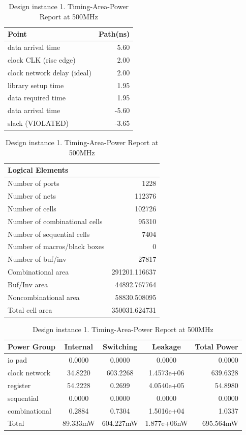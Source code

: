 \documentclass[journal,comsoc]{IEEEtran}
\begin{document}
\begin{table}[t!]
	\centering%
	\caption{Design instance 1. Timing-Area-Power Report at 500MHz}
	\label{tab:reporte2} 	
	\begin{tabular}{@{}lr@{}}
		Point 						& Path(ns)\\
		\hline\hline
		data arrival time   		& 5.60\\ 
		clock CLK (rise edge)  		& 2.00\\
		clock network delay (ideal) & 2.00\\
		library setup time			& 1.95\\
		\hline
		data required time			& 1.95\\
		data arrival time           & -5.60\\
		\hline
		slack (VIOLATED)            & -3.65\\	
		\hline
	\end{tabular}

	\begin{tabular}{@{}lr@{}}\\
		Logical Elements\\
		\hline\hline
		Number of ports               &1228\\
		Number of nets                &112376\\
		Number of cells               &102726\\
		Number of combinational cells &95310\\
		Number of sequential cells    &7404\\
		Number of macros/black boxes  &0\\
		Number of buf/inv             &27817\\
		\hline
		Combinational area            &291201.116637\\
		Buf/Inv area                  &44892.767764\\
		Noncombinational area         &58830.508095\\
		\hline
		Total cell area               &350031.624731\\	
		\hline
	\end{tabular}

	\begin{tabular}{@{}lcccr@{}}\\
		Power Group		 &Internal 	&Switching 	&Leakage		&Total Power\\
		\hline\hline
		io pad           &0.0000    &0.0000     &0.0000    		&0.0000\\
		clock network    &34.8220   &603.2268   &1.4573e+06 	&639.6328\\
		register         &54.2228   &0.2699     &4.0540e+05 	&54.8980\\  
		sequential       &0.0000    &0.0000     &0.0000     	&0.0000\\  
		combinational    &0.2884    &0.7304     &1.5016e+04 	&1.0337\\ 
		\hline
		Total            &89.333mW  &604.227mW  &1.877e+06nW	&695.564mW\\	
		\hline
	\end{tabular}
\end{table}
\end{document}

